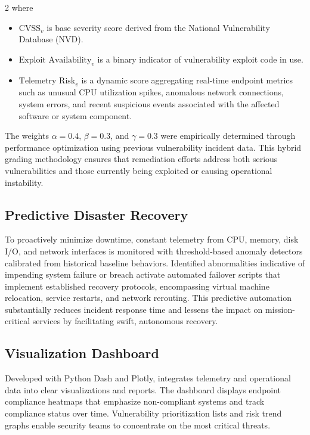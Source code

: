 \documentclass[10pt]{article} %
\begin{document}
\begin{multicols}{2}
where

\begin{itemize}
    \item \( \text{CVSS}_v \) is base severity score derived from the National Vulnerability Database (NVD).
    \item \( \text{Exploit Availability}_v \) is a binary indicator of vulnerability exploit code in use.
    \item \( \text{Telemetry Risk}_v \) is a dynamic score aggregating real-time endpoint metrics such as unusual CPU utilization spikes, anomalous network connections, system errors, and recent suspicious events associated with the affected software or system component.
\end{itemize}

The weights \( \alpha = 0.4 \), \( \beta = 0.3 \), and \( \gamma = 0.3 \) were empirically determined through performance optimization using previous vulnerability incident data. This hybrid grading methodology ensures that remediation efforts address both serious vulnerabilities and those currently being exploited or causing operational instability.


\subsection{Predictive Disaster Recovery}

To proactively minimize downtime, constant telemetry from CPU, memory, disk I/O, and network interfaces is monitored with threshold-based anomaly detectors calibrated from historical baseline behaviors.  Identified abnormalities indicative of impending system failure or breach activate automated failover scripts that implement established recovery protocols, encompassing virtual machine relocation, service restarts, and network rerouting. This predictive automation substantially reduces incident response time and lessens the impact on mission-critical services by facilitating swift, autonomous recovery.

\subsection{Visualization Dashboard}

Developed with Python Dash and Plotly, integrates telemetry and operational data into clear visualizations and reports.  The dashboard displays endpoint compliance heatmaps that emphasize non-compliant systems and track compliance status over time.  Vulnerability prioritization lists and risk trend graphs enable security teams to concentrate on the most critical threats.


\end{multicols}
\end{document}
